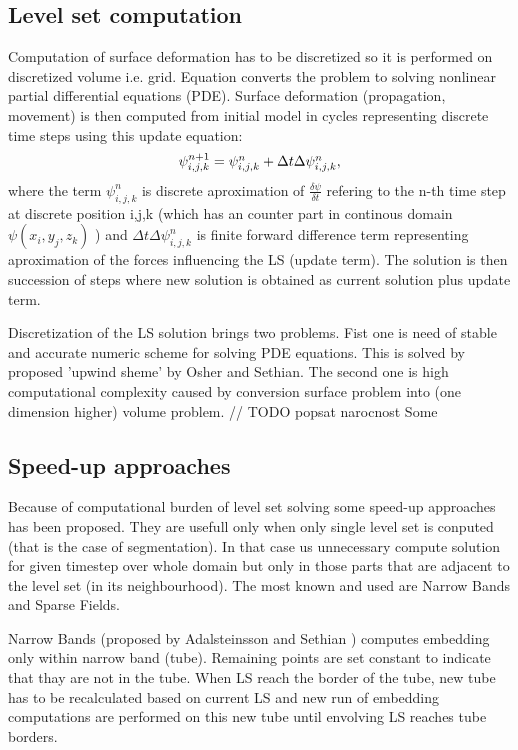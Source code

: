 \subsection{Level set computation}

Computation of surface deformation has to be discretized so it is performed on discretized volume i.e. grid. Equation converts the problem to solving nonlinear partial differential equations (PDE). Surface deformation (propagation, movement) is then computed from initial model in cycles representing discrete time steps using this update equation:
\begin{equation}
$$\psi_{i,j,k}^{n+1} = \psi_{i,j,k}^{n} + \Delta t \Delta \psi_{i,j,k}^{n}$$,
\end{equation}
where the term $\psi_{i,j,k}^{n}$ is discrete aproximation of $\frac{\delta\psi}{\delta t}$ refering to the n-th time step at discrete position i,j,k (which has an counter part in continous domain $\psi(x_i, y_j, z_k)$ ) and $\Delta t \Delta \psi_{i,j,k}^{n}$ is finite forward difference term representing aproximation of the forces influencing the LS (update term). The solution is then succession of steps where new solution is obtained as current solution plus update term.

Discretization of the LS solution brings two problems. Fist one is need of stable and accurate numeric scheme for solving PDE equations. This is solved by proposed 'upwind sheme' by Osher and Sethian. The second one is high computational complexity caused by conversion surface problem into (one dimension higher) volume problem. 
// TODO popsat narocnost
Some 

\subsection{Speed-up approaches}

Because of computational burden of level set solving some speed-up approaches has been proposed. They are usefull only when only single level set is conputed (that is the case of segmentation). In that case us unnecessary compute solution for given timestep over whole domain but only in those parts that are adjacent to the level set (in its neighbourhood). The most known and used are Narrow Bands and Sparse Fields. 

Narrow Bands (proposed by Adalsteinsson and Sethian \cite{sethianFastLS}) computes embedding only within narrow band (tube). Remaining points are set constant to indicate that thay are not in the tube. When LS reach the border of the tube, new tube has to be recalculated based on current LS and new run of embedding computations are performed on this new tube until envolving LS reaches tube borders.

